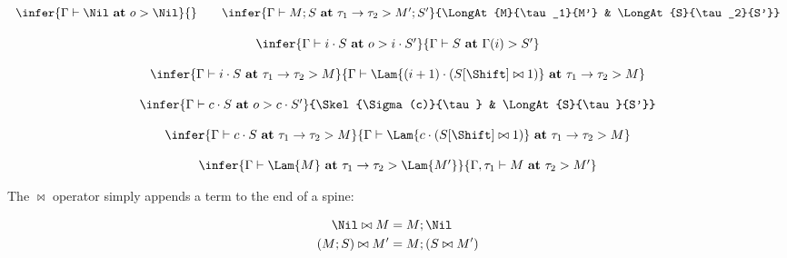 $$
\begin{array}{lcr}
\infer{\LongAt{\Nil}{\SkBase}{\Nil}}{} && 
\infer{\LongAt{M;S}{\tau_1\to\tau_2}{M';S'}}{\LongAt{M}{\tau_1}{M'} & \LongAt{S}{\tau_2}{S'}}
\end{array} 
$$

\bigskip 
{}
\bigskip 

\newcommand{\Concat}{\bowtie}

$$
\begin{array}{c}
\infer{\LongAt{i\cdot S}{\SkBase}{i\cdot S'}}{\LongAt{S}{\Gamma(i)}{S'}}\\\\
\infer{\LongAt{i\cdot S}{\tau_1\to\tau_2}{M}}{\LongAt{\Lam{(i+1)\cdot(S[\Shift] \Concat 1)}}{\tau_1\to\tau_2}{M}}\\\\
\infer{\LongAt{c\cdot S}{\SkBase}{c\cdot S'}}{\Skel{\Sigma(c)}{\tau} & \LongAt{S}{\tau}{S'}}\\\\
\infer{\LongAt{c\cdot S}{\tau_1\to\tau_2}{M}}{\LongAt{\Lam{c\cdot(S[\Shift] \Concat 1)}}{\tau_1\to\tau_2}{M}}\\\\
\infer{\LongAt{\Lam{M}}{\tau_1\to\tau_2}{\Lam{M'}}}{\LongAt[\Gamma,\tau_1]{M}{\tau_2}{M'}}
\end{array} 
$$


\bigskip 
\framebox{$S\Concat M$}
\bigskip 

The $\Concat$ operator simply appends a term to the end of a spine:

\begin{align*} 
\Nil\Concat M &= M;\Nil\\
(M;S)\Concat M' &= M;(S\Concat M')
\end{align*} 
